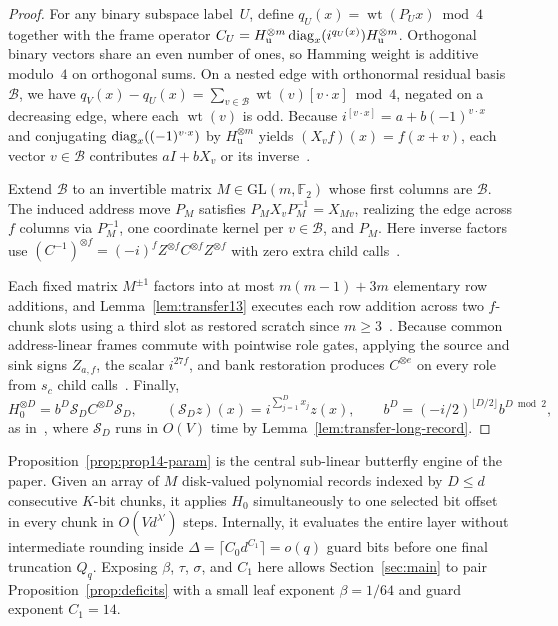 \begin{proof}
For any binary subspace label~$U$, define $q_U(x)=\operatorname{wt}(P_Ux)\bmod4$ together with the frame operator $C_U=\allowbreak H_{\mathrm u}^{\otimes m}\operatorname{diag}_x(i^{q_U(x)})H_{\mathrm u}^{\otimes m}$. Orthogonal binary vectors share an even number of ones, so Hamming weight is additive modulo~$4$ on orthogonal sums. On a nested edge with orthonormal residual basis $\mathcal B$, we have $q_V(x)-q_U(x)=\sum_{v\in\mathcal B}\operatorname{wt}(v)[v\cdot x]\bmod4$, negated on a decreasing edge, where each $\operatorname{wt}(v)$ is odd. Because $i^{[v\cdot x]}=a+b(-1)^{v\cdot x}$ and conjugating $\operatorname{diag}_x((-1)^{v\cdot x})$ by $H_{\mathrm u}^{\otimes m}$ yields $(X_vf)(x)=f(x+v)$, each vector $v\in\mathcal B$ contributes $aI+bX_v$ or its inverse~\cite[proof of Prop.~8, \S3.5]{OAI26}.

Extend $\mathcal B$ to an invertible matrix $M\in\mathrm{GL}(m,\mathbb F_2)$ whose first columns are $\mathcal B$. The induced address move $P_M$ satisfies $P_MX_vP_M^{-1}=X_{Mv}$, realizing the edge across $f$ columns via $P_M^{-1}$, one coordinate kernel per $v\in\mathcal B$, and $P_M$. Here inverse factors use $(C^{-1})^{\otimes f}=(-i)^fZ^{\otimes f}C^{\otimes f}Z^{\otimes f}$ with zero extra child calls~\cite[\S5.1, (15)--(17)]{OAI26}.

Each fixed matrix $M^{\pm1}$ factors into at most $m(m-1)+3m$ elementary row additions, and Lemma~\ref{lem:transfer13} executes each row addition across two $f$-chunk slots using a third slot as restored scratch since $m\ge3$~\cite[\S5.1, p.~27 and \S5.2, pp.~31--32]{OAI26}. Because common address-linear frames commute with pointwise role gates, applying the source and sink signs $Z_{a,f}$, the scalar $i^{27f}$, and bank restoration produces $C^{\otimes e}$ on every role from $s_c$ child calls~\cite[proof of Prop.~8, \S3.5 and \S5.1, pp.~27--28]{OAI26}. Finally,
\begin{equation}\label{eq:oai-h0-transfer}
  H_0^{\otimes D}=b^D\mathcal S_DC^{\otimes D}\mathcal S_D,\qquad
  (\mathcal S_Dz)(x)=i^{\sum_{j=1}^Dx_j}z(x),\qquad b^D=(-i/2)^{\lfloor D/2\rfloor}b^{D\bmod2},
\end{equation}
as in~\cite[\S5.1, (18)]{OAI26}, where $\mathcal S_D$ runs in $O(V)$ time by Lemma~\ref{lem:transfer-long-record}.
\end{proof}

Proposition~\ref{prop:prop14-param} is the central sub-linear butterfly engine of the paper. Given an array of $M$ disk-valued polynomial records indexed by $D\le d$ consecutive $K$-bit chunks, it applies $H_0$ simultaneously to one selected bit offset in every chunk in $O(V d^{\lambda'})$ steps. Internally, it evaluates the entire layer without intermediate rounding inside $\Delta=\lceil C_0 d^{C_1}\rceil=o(q)$ guard bits before one final truncation $Q_q$. Exposing $\beta$, $\tau$, $\sigma$, and $C_1$ here allows Section~\ref{sec:main} to pair Proposition~\ref{prop:deficits} with a small leaf exponent $\beta=1/64$ and guard exponent $C_1=14$.

